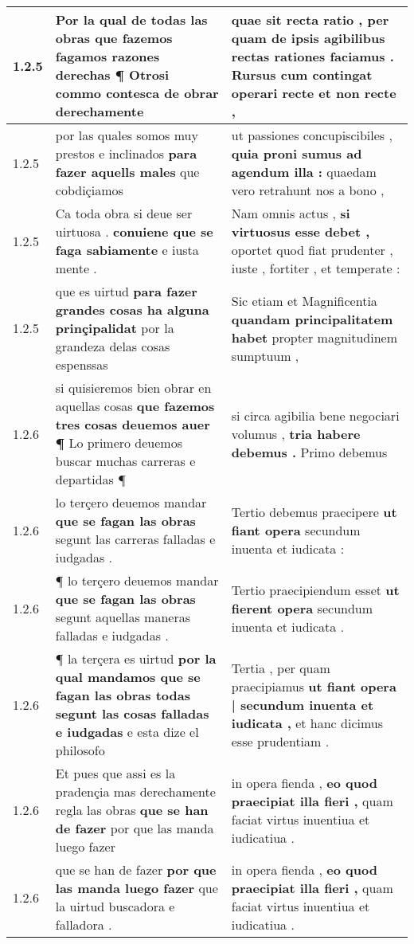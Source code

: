 \begin{tabular}{|p{1cm}|p{6.5cm}|p{6.5cm}|}
1.2.5 & Por la qual de todas las obras \textbf{ que fazemos fagamos razones derechas ¶ } Otrosi commo contesca de obrar derechamente & quae sit recta ratio , \textbf{ per quam de ipsis agibilibus rectas rationes faciamus . } Rursus cum contingat operari recte et non recte , \\\hline
1.2.5 & por las quales somos muy prestos e inclinados \textbf{ para fazer aquells males } que cobdiçiamos & ut passiones concupiscibiles , \textbf{ quia proni sumus ad agendum illa : } quaedam vero retrahunt nos a bono , \\\hline
1.2.5 & Ca toda obra si deue ser uirtuosa . \textbf{ conuiene que se faga sabiamente } e iusta mente . & Nam omnis actus , \textbf{ si virtuosus esse debet , } oportet quod fiat prudenter , iuste , fortiter , et temperate : \\\hline
1.2.5 & que es uirtud \textbf{ para fazer grandes cosas ha alguna prinçipalidat } por la grandeza delas cosas espenssas & Sic etiam et Magnificentia \textbf{ quandam principalitatem habet } propter magnitudinem sumptuum , \\\hline
1.2.6 & si quisieremos bien obrar en aquellas cosas \textbf{ que fazemos tres cosas deuemos auer ¶ } Lo primero deuemos buscar muchas carreras e departidas ¶ & si circa agibilia bene negociari volumus , \textbf{ tria habere debemus . } Primo debemus \\\hline
1.2.6 & lo terçero deuemos mandar \textbf{ que se fagan las obras } segunt las carreras falladas e iudgadas . & Tertio debemus praecipere \textbf{ ut fiant opera } secundum inuenta et iudicata : \\\hline
1.2.6 & ¶ lo terçero deuemos mandar \textbf{ que se fagan las obras } segunt aquellas maneras falladas e iudgadas . & Tertio praecipiendum esset \textbf{ ut fierent opera } secundum inuenta et iudicata . \\\hline
1.2.6 & ¶ la terçera es uirtud \textbf{ por la qual mandamos que se fagan las obras todas segunt las cosas falladas e iudgadas } e esta dize el philosofo & Tertia , per quam praecipiamus \textbf{ ut fiant opera | secundum inuenta et iudicata , } et hanc dicimus esse prudentiam . \\\hline
1.2.6 & Et pues que assi es la pradençia mas derechamente regla las obras \textbf{ que se han de fazer } por que las manda luego fazer & in opera fienda , \textbf{ eo quod praecipiat illa fieri , } quam faciat virtus inuentiua et iudicatiua . \\\hline
1.2.6 & que se han de fazer \textbf{ por que las manda luego fazer } que la uirtud buscadora e falladora . & in opera fienda , \textbf{ eo quod praecipiat illa fieri , } quam faciat virtus inuentiua et iudicatiua . \\\hline

\end{tabular}
